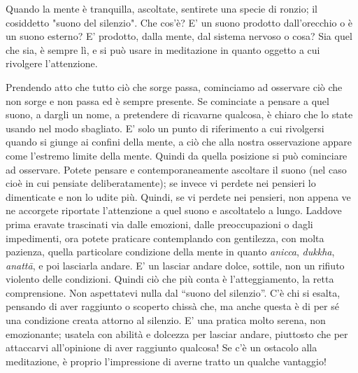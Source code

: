 
Quando la mente è tranquilla, ascoltate, sentirete una specie di ronzio;
il cosiddetto "suono del silenzio". Che cos'è? E' un suono prodotto
dall'orecchio o è un suono esterno? E' prodotto, dalla mente, dal
sistema nervoso o cosa? Sia quel che sia, è sempre lì, e si può usare in
meditazione in quanto oggetto a cui rivolgere l'attenzione.

Prendendo atto che tutto ciò che sorge passa, cominciamo ad osservare
ciò che non sorge e non passa ed è sempre presente. Se cominciate a
pensare a quel suono, a dargli un nome, a pretendere di ricavarne
qualcosa, è chiaro che lo state usando nel modo sbagliato. E' solo un
punto di riferimento a cui rivolgersi quando si giunge ai confini della
mente, a ciò che alla nostra osservazione appare come l'estremo limite
della mente. Quindi da quella posizione si può cominciare ad osservare.
Potete pensare e contemporaneamente ascoltare il suono (nel caso cioè in
cui pensiate deliberatamente); se invece vi perdete nei pensieri lo
dimenticate e non lo udite più. Quindi, se vi perdete nei pensieri, non
appena ve ne accorgete riportate l'attenzione a quel suono e ascoltatelo
a lungo. Laddove prima eravate trascinati via dalle emozioni, dalle
preoccupazioni o dagli impedimenti, ora potete praticare contemplando
con gentilezza, con molta pazienza, quella particolare condizione della
mente in quanto \textit{anicca}, \textit{dukkha}, \textit{anattā}, e poi lasciarla andare. E' un
lasciar andare dolce, sottile, non un rifiuto violento delle condizioni.
Quindi ciò che più conta è l'atteggiamento, la retta comprensione. Non
aspettatevi nulla dal “suono del silenzio”. C'è chi si esalta, pensando
di aver raggiunto o scoperto chissà che, ma anche questa è di per sé una
condizione creata attorno al silenzio. E' una pratica molto serena, non
emozionante; usatela con abilità e dolcezza per lasciar andare,
piuttosto che per attaccarvi all'opinione di aver raggiunto qualcosa! Se
c'è un ostacolo alla meditazione, è proprio l'impressione di averne
tratto un qualche vantaggio!

